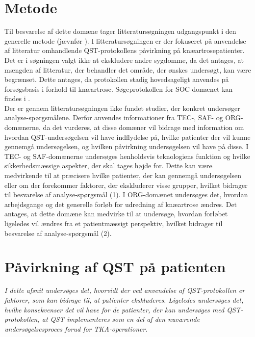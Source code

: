 \section{Metode}
Til besvarelse af dette domæne tager litteratursøgningen udgangspunkt i den generelle metode (jævnfør ). I litteratursøgningen er der fokuseret på anvendelse af litteratur omhandlende QST-protokollens påvirkning på knæartrosepatienter. Det er i søgningen valgt ikke at ekskludere andre sygdomme, da det antages, at mængden af litteratur, der behandler det område, der ønskes undersøgt, kan være begrænset. Dette antages, da protokollen stadig hovedsageligt anvendes på forsøgsbasis i forhold til knæartrose. Søgeprotokollen for SOC-domænet kan findes i . \\
Der er gennem litteratursøgningen ikke fundet studier, der konkret undersøger analyse-spørgsmålene. Derfor anvendes informationer fra TEC-, SAF- og ORG-domænerne, da det vurderes, at disse domæner vil bidrage med information om hvordan QST-undersøgelsen vil have indflydelse på, hvilke patienter der vil kunne gennemgå undersøgelsen, og hvilken påvirkning undersøgelsen vil have på disse. I TEC- og SAF-domænerne undersøges henholdsvis teknologiens funktion og hvilke sikkerhedsmæssige aspekter, der skal tages højde for. Dette kan være medvirkende til at præcisere hvilke patienter, der kan gennemgå undersøgelsen eller om der forekommer faktorer, der ekskluderer visse grupper, hvilket bidrager til besvarelse af analyse-spørgsmål (1). I ORG-domænet undersøges det, hvordan arbejdsgange og det generelle forløb for udredning af knæartrose ændres. Det antages, at dette domæne kan medvirke til at undersøge, hvordan forløbet ligeledes vil ændres fra et patientmæssigt perspektiv, hvilket bidrager til besvarelse af analyse-spørgsmål (2). 
 
\section{Påvirkning af QST på patienten}
\textit{I dette afsnit undersøges det, hvorvidt der ved anvendelse af QST-protokollen er faktorer, som kan bidrage til, at patienter ekskluderes. Ligeledes undersøges det, hvilke konsekvenser det vil have for de patienter, der kan undersøges med QST-protokollen, at QST implementeres som en del af den nuværende undersøgelsesproces forud for TKA-operationer.}

